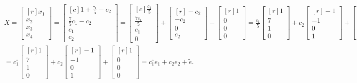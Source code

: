 \begin{gather}
	X=\begin{bmatrix*}[r]
		x_1\\
		x_2\\x_3\\x_4
	\end{bmatrix*}=\begin{bmatrix*}[c]
	1+\frac{c_1}{5}-c_2\\
	\frac{7}{5}c_1-c_2\\
	c_1\\
	c_2
\end{bmatrix*}=\begin{bmatrix*}[c]
\frac{c_1}{5}\\\frac{7c_1}{5}\\c_1\\0
\end{bmatrix*}+\begin{bmatrix*}[r]
-c_2\\-c_2\\0\\c_2
\end{bmatrix*}+\begin{bmatrix*}[r]
1\\0\\0\\0
\end{bmatrix*}=\frac{c_1}{5}\begin{bmatrix*}[r]
1\\7\\1\\0
\end{bmatrix*}+c_2\begin{bmatrix*}[r]
-1\\-1\\0\\1
\end{bmatrix*}+\begin{bmatrix*}[r]
1\\0\\0\\0
\end{bmatrix*}=\\
=c_1^\circ\begin{bmatrix*}[r]
	1\\7\\1\\0
\end{bmatrix*}+c_2\begin{bmatrix*}[r]
	-1\\-1\\0\\1
\end{bmatrix*}+\begin{bmatrix*}[r]
	1\\0\\0\\0
\end{bmatrix*}=c_1^\circ e_1+c_2e_2+\tilde{e}.
\end{gather}
